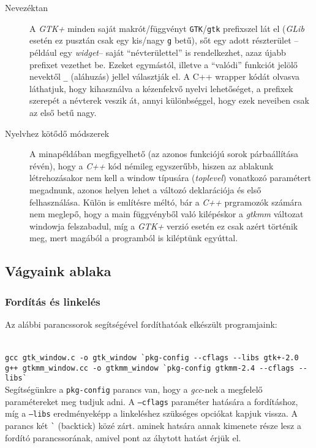 \begin{description}
 \item[Nevezéktan] A \textit{GTK+} minden saját makrót/függvényt \texttt{GTK}/\texttt{gtk} prefixszel lát el (\textit{GLib} esetén ez pusztán csak egy kis/nagy \texttt{g} betű), sőt egy adott részterület --például egy \textit{widget}-- saját ``névterülettel'' is rendelkezhet, azaz újabb prefixet vezethet be. Ezeket egymástól, illetve a ``valódi'' funkciót jelölő nevektől \texttt{\_} (aláhuzás) jellel választják el. A C++ wrapper kódát olvasva láthatjuk, hogy kihasználva a kézenfekvő nyelvi lehetőséget, a prefixek szerepét a névterek veszik át, annyi különbséggel, hogy ezek neveiben csak az első betű nagy.
 \item[Nyelvhez kötődő módszerek] A minapéldában megfigyelhető (az azonos funkciójú sorok párbaállítása révén), hogy a \textit{C++} kód némileg egyszerűbb, hiszen az ablakunk létrehozásakor nem kell a window típusára (\textit{toplevel}) vonatkozó paramétert megadnunk, azonos helyen lehet a változó deklarációja és első felhasználása. Külön is említésre méltó, bár a \textit{C++} prgramozók számára nem meglepő, hogy a main függvényből való kilépéskor a \textit{gtkmm} változat windowja felszabadul, míg a \textit{GTK+} verzió esetén ez csak azért történik meg, mert magából a programból is kiléptünk egyúttal.
\end{description}

\subsection{Vágyaink ablaka}

\subsubsection{Fordítás és linkelés}

Az alábbi parancssorok segítségével fordíthatóak elkészült programjaink:

\fontsize{8pt}{8pt}
\ \\
\texttt{gcc gtk\_window.c -o gtk\_window \`{}pkg-config {-}-cflags {-}-libs gtk+-2.0}
\ \\
\texttt{g++ gtkmm\_window.cc -o gtkmm\_window \`{}pkg-config gtkmm-2.4 {-}-cflags {-}-libs\`{}}
\\

Segítségünkre a \texttt{pkg-config} parancs van, hogy a \textit{gcc}-nek a megfelelő paramétereket meg tudjuk adni. A \texttt{--cflags} paraméter hatására a fordításhoz, míg a \texttt{--libs} eredményeképp a linkeléshez szükséges opciókat kapjuk vissza. A parancs két \texttt{\`} (backtick) közé zárt. aminek hatsára annak kimenete része lesz a fordító parancssorának, amivel pont az áhytott hatást érjük el.

